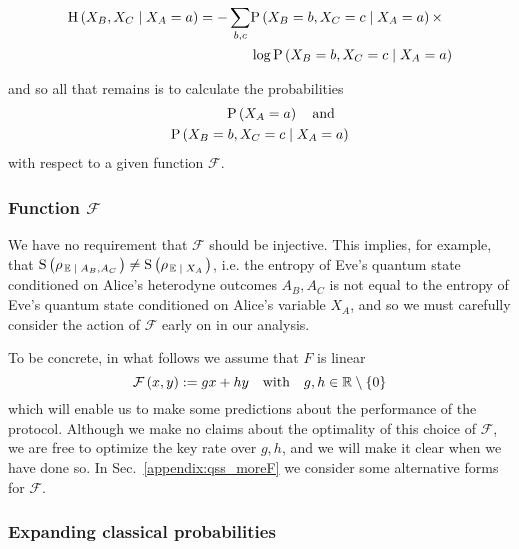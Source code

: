 \begin{align}
\text{H}\left(X_B, X_C \given X_A=a\right) = - \sum_{b, c}  &\text{P}\left(X_B=b, X_C=c \given X_A=a\right) \times \notag \\
%
&\log \text{P}\left(X_B=b, X_C=c \given X_A=a\right) \label{eqn:qss_deriv_4_1}
\end{align}

\noindent and so all that remains is to calculate the probabilities 
\begin{align}
\label{eqn:qss_prob1} \text{P}\left(X_A=a\right) \qq{and} \\
\label{eqn:qss_prob2} \text{P}\left(X_B=b, X_C=c \given X_A=a\right)
\end{align}
with respect to a given function $\mathcal{F}$.


\subsubsection{Function $\mathcal{F}$}


We have no requirement that $\mathcal{F}$ should be injective. This implies, for example, that $\text{S}\left(\rho_{\left.\mathbb{E} \; \middle| \; A_B, A_C\right.}\right) \ne \text{S}\left(\rho_{\left. \mathbb{E} \; \middle| \; X_A\right.}\right)$, i.e. the entropy of Eve's quantum state conditioned on Alice's heterodyne outcomes $A_B, A_C$ is not equal to the entropy of Eve's quantum state conditioned on Alice's variable $X_A$, and so we must carefully consider the action of $\mathcal{F}$ early on in our analysis. 

To be concrete, in what follows we assume that $F$ is linear
\begin{equation}\label{eqn:qss_F_linear}
\mathcal{F}\left(x, y\right) := g x + h y \qq{with} g, h \in \mathbb{R}\setminus \left\{0\right\}
\end{equation} 
which will enable us to make some predictions about the performance of the protocol. Although we make no claims about the optimality of this choice of $\mathcal{F}$, we are free to optimize the key rate over $g, h$, and we will make it clear when we have done so. In Sec.~\ref{appendix:qss_moreF} we consider some alternative forms for $\mathcal{F}$.





\subsubsection{Expanding classical probabilities}

